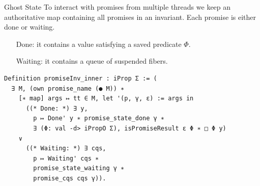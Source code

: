 \documentclass[aspectratio=43]{beamer}
\begin{document}
\begin{frame}[fragile]{Ghost State}
    To interact with promises from multiple threads we keep an authoritative map containing all promises in an invariant.
    Each promise is either done or waiting.
    \begin{itemize}
        \item[Done:] it contains a value satisfying a saved predicate \(\Phi\).
        \item[Waiting:] it contains a queue of suspended fibers.
    \end{itemize}
    \begin{verbatim}
Definition promiseInv_inner : iProp Σ := (
  ∃ M, (own promise_name (● M)) ∗ 
    [∗ map] args ↦ tt ∈ M, let '(p, γ, ε) := args in
      ((* Done: *) ∃ y,
        p ↦ Done' y ∗ promise_state_done γ ∗ 
        ∃ (Φ: val -d> iPropO Σ), isPromiseResult ε Φ ∗ □ Φ y)
    ∨
      ((* Waiting: *) ∃ cqs,
        p ↦ Waiting' cqs ∗
        promise_state_waiting γ ∗
        promise_cqs cqs γ)).
    \end{verbatim}
\end{frame}
\end{document}
